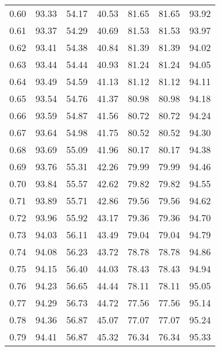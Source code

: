 \begin{tabular}{|c|c|c|c|c|c|c|}
      0.60 &     93.33 &     54.17 &      40.53 &   81.65 &      81.65 &         93.92 \\
      0.61 &     93.37 &     54.29 &      40.69 &   81.53 &      81.53 &         93.97 \\
      0.62 &     93.41 &     54.38 &      40.84 &   81.39 &      81.39 &         94.02 \\
      0.63 &     93.44 &     54.44 &      40.93 &   81.24 &      81.24 &         94.05 \\
      0.64 &     93.49 &     54.59 &      41.13 &   81.12 &      81.12 &         94.11 \\
      0.65 &     93.54 &     54.76 &      41.37 &   80.98 &      80.98 &         94.18 \\
      0.66 &     93.59 &     54.87 &      41.56 &   80.72 &      80.72 &         94.24 \\
      0.67 &     93.64 &     54.98 &      41.75 &   80.52 &      80.52 &         94.30 \\
      0.68 &     93.69 &     55.09 &      41.96 &   80.17 &      80.17 &         94.38 \\
      0.69 &     93.76 &     55.31 &      42.26 &   79.99 &      79.99 &         94.46 \\
      0.70 &     93.84 &     55.57 &      42.62 &   79.82 &      79.82 &         94.55 \\
      0.71 &     93.89 &     55.71 &      42.86 &   79.56 &      79.56 &         94.62 \\
      0.72 &     93.96 &     55.92 &      43.17 &   79.36 &      79.36 &         94.70 \\
      0.73 &     94.03 &     56.11 &      43.49 &   79.04 &      79.04 &         94.79 \\
      0.74 &     94.08 &     56.23 &      43.72 &   78.78 &      78.78 &         94.86 \\
      0.75 &     94.15 &     56.40 &      44.03 &   78.43 &      78.43 &         94.94 \\
      0.76 &     94.23 &     56.65 &      44.44 &   78.11 &      78.11 &         95.05 \\
      0.77 &     94.29 &     56.73 &      44.72 &   77.56 &      77.56 &         95.14 \\
      0.78 &     94.36 &     56.87 &      45.07 &   77.07 &      77.07 &         95.24 \\
      0.79 &     94.41 &     56.87 &      45.32 &   76.34 &      76.34 &         95.33 \\

\end{tabular}
